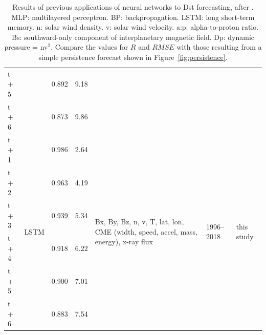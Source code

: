 \documentclass{agujournal2018}
\begin{document}
\begin{table}[htpb]
\begin{tabular}{l p{2.5cm} l l p{2.5cm} p{0.8cm} l}
t + 5 &  & 0.892 & 9.18 &&  &  \\
t + 6 &  & 0.873 & 9.86 &&  &  \\ \hline
t + 1 & \multirow{6}{*}{LSTM} & 0.986 & 2.64 & \multirow{6}{2.5cm}{Bx, By, Bz, n, v, T, lat, lon, CME (width, speed, accel, mass, energy), x-ray flux} & \multirow{6}{0.8cm}{1996--2018} &  \multirow{6}{*}{this study} \\
t + 2 &  & 0.963 & 4.19 & & & \\
t + 3 &  & 0.939 & 5.34 & & & \\ 
t + 4 &  & 0.918 & 6.22 & & & \\ 
t + 5 &  & 0.900 & 7.01 & & & \\ 
t + 6 &  & 0.883 & 7.54 & & & \\
\end{tabular}
\normalsize
\caption{Results of previous applications of neural networks to Dst forecasting, after \cite{Lazzus2017}. MLP: multilayered perceptron. BP: backpropagation. LSTM: long short-term memory. n: solar wind density. v: solar wind  velocity. a:p: alpha-to-proton ratio. Bs: southward-only component of interplanetary magnetic field. Dp: dynamic pressure = nv$^2$. Compare the values for $R$ and $RMSE$ with those resulting from a simple persistence forecast shown in Figure~\ref{fig:persistence}.}
\label{tab:prevNN}
\end{table}




\clearpage

\end{document}

